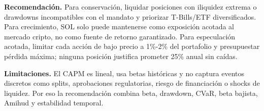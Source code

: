\documentclass[10pt,a4paper]{article}
\begin{document}
\textbf{Recomendación.} Para conservación, liquidar posiciones con iliquidez extrema o drawdowns incompatibles con el mandato y priorizar T-Bills/ETF diversificados. Para crecimiento, SOL solo puede mantenerse como exposición acotada al mercado cripto, no como fuente de retorno garantizado. Para especulación acotada, limitar cada acción de bajo precio a 1\%-2\% del portafolio y presupuestar pérdida máxima; ninguna posición justifica prometer 25\% anual sin caídas.

\textbf{Limitaciones.} El CAPM es lineal, usa betas históricas y no captura eventos discretos como splits, aprobaciones regulatorias, riesgo de financiación o shocks de liquidez. Por eso la recomendación combina beta, drawdown, CVaR, beta bajista, Amihud y estabilidad temporal.
\end{document}
